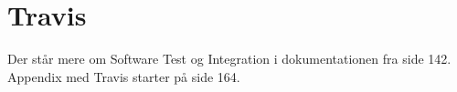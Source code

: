 \section{Travis}

Der står mere om Software Test og Integration i dokumentationen fra side 142. Appendix med Travis starter på side 164.

